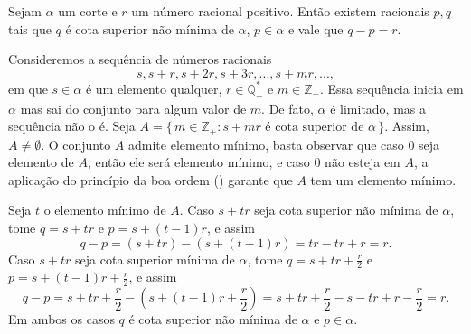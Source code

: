 \documentclass[../main.tex]{subfiles}
\begin{document}
\begin{lema}\label{reais-lema-pqNaoMinimo}
    Sejam $\alpha$ um corte e $r$ um número racional positivo. Então existem racionais $p,q$ tais que $q$ é cota superior não mínima de $\alpha$, $p \in \alpha$ e vale que $q-p = r$.
\end{lema}
\begin{dem}
    Consideremos a sequência de números racionais 
    \[ s, s+r, s+2r, s+3r, ..., s+mr, ...,\] 
    em que $s \in \alpha$ é um elemento qualquer, $r \in \mathbb{Q}_{+}^*$ e $m \in \mathbb{Z}_{+}$. Essa sequência inicia em $\alpha$ mas sai do conjunto para algum valor de $m$. De fato, $\alpha$ é limitado, mas a sequência não o é. Seja $A = \{\,m \in \mathbb{Z}_{+} : s+mr \text{ é cota superior de } \alpha \,\}$. Assim, $A \neq \emptyset$. O conjunto $A$ admite elemento mínimo, basta observar que caso $0$ seja elemento de $A$, então ele será elemento mínimo, e caso $0$ não esteja em $A$, a aplicação do princípio da boa ordem () garante que $A$ tem um elemento mínimo.

    Seja $t$ o elemento mínimo de $A$. Caso $s+tr$ seja cota superior não mínima de $\alpha$, tome $q = s+tr$ e $p = s+(t-1)r$, e assim 
    \[ q-p =  (s+tr) - (s+(t-1)r) = tr -tr + r = r. \]
    Caso $s+tr$ seja cota superior mínima de $\alpha$, tome $q = s+tr+\frac{r}{2}$ e $p = s+(t-1)r+\frac{r}{2}$, e assim 
    \[ q - p = s+tr+\frac{r}{2} - \left(s+(t-1)r+\frac{r}{2}\right) = s + tr + \frac{r}{2} - s - tr + r - \frac{r}{2} = r. \]
    Em ambos os casos $q$ é cota superior não mínima de $\alpha$ e $p \in \alpha$.
\end{dem}
\end{document}
